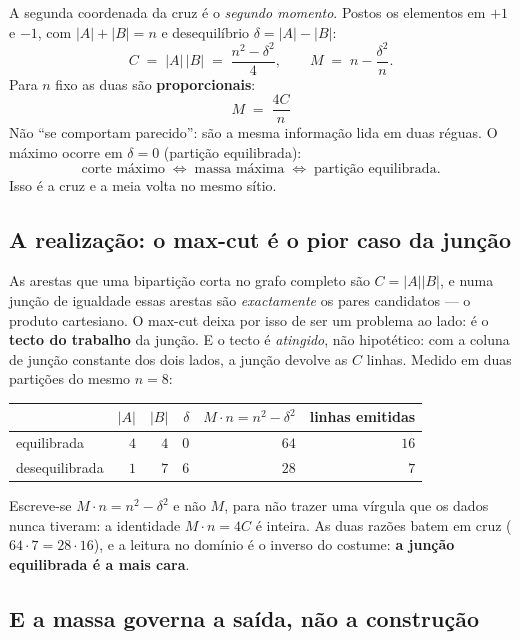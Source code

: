 \documentclass[11pt,a4paper]{article}
\begin{document}
A segunda coordenada da cruz é o \emph{segundo momento}. Postos os elementos em $+1$ e $-1$, com
$|A|+|B|=n$ e desequilíbrio $\delta=|A|-|B|$:
\[
  C \;=\; |A|\,|B| \;=\; \frac{n^{2}-\delta^{2}}{4},
  \qquad
  M \;=\; n - \frac{\delta^{2}}{n} .
\]
Para $n$ fixo as duas são \textbf{proporcionais}:
\[
  \boxed{\;M \;=\; \dfrac{4C}{n}\;}
\]
Não ``se comportam parecido'': são a mesma informação lida em duas réguas. O máximo ocorre em
$\delta=0$ (partição equilibrada):
\[
\boxed{
\text{corte máximo}
\;\Longleftrightarrow\;
\text{massa máxima}
\;\Longleftrightarrow\;
\text{partição equilibrada}.
}
\]
Isso é a cruz e a meia volta no mesmo sítio.

\subsection*{A realização: o max-cut é o pior caso da junção}

As arestas que uma bipartição corta no grafo completo são $C=|A||B|$, e numa junção de igualdade
essas arestas são \emph{exactamente} os pares candidatos --- o produto cartesiano. O max-cut deixa
por isso de ser um problema ao lado: é o \textbf{tecto do trabalho} da junção. E o tecto é
\emph{atingido}, não hipotético: com a coluna de junção constante dos dois lados, a junção devolve
as $C$ linhas. Medido em duas partições do mesmo $n=8$:

\begin{center}\small
\begin{tabular}{@{}lrrrrr@{}}
\toprule
& $|A|$ & $|B|$ & $\delta$ & $M\!\cdot\!n=n^2-\delta^2$ & linhas emitidas \\
\midrule
equilibrada & $4$ & $4$ & $0$ & $64$ & $16$ \\
desequilibrada & $1$ & $7$ & $6$ & $28$ & $7$ \\
\bottomrule
\end{tabular}
\end{center}

\noindent Escreve-se $M\!\cdot\!n=n^{2}-\delta^{2}$ e não $M$, para não trazer uma vírgula que os
dados nunca tiveram: a identidade $M\!\cdot\!n=4C$ é inteira. As duas razões batem em cruz
($64\cdot 7=28\cdot 16$), e a leitura no domínio é o inverso do costume: \textbf{a junção
equilibrada é a mais cara}.

\subsection*{E a massa governa a saída, não a construção}
\end{document}
